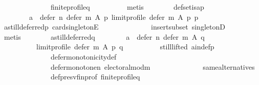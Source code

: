 \begin{isabellebody}
\ \ \ \ \ \ \ \ \ \ \ \ \ \ finite{\isacharunderscore}{\kern0pt}profile{\isacharunderscore}{\kern0pt}q\isanewline
\ \ \ \ \ \ \ \ \isamarkupfalse%
\ metis\isanewline
\ \ \ \ \ \ \isamarkupfalse%
\ def{\isacharunderscore}{\kern0pt}set{\isacharunderscore}{\kern0pt}is{\isacharunderscore}{\kern0pt}a{\isacharunderscore}{\kern0pt}p{\isacharcolon}{\kern0pt}\isanewline
\ \ \ \ \ \ \ \ {\isachardoublequoteopen}{\isacharbraceleft}{\kern0pt}a{\isacharbraceright}{\kern0pt}\ {\isacharequal}{\kern0pt}\ defer\ n\ {\isacharparenleft}{\kern0pt}defer\ m\ A\ p{\isacharparenright}{\kern0pt}\ {\isacharparenleft}{\kern0pt}limit{\isacharunderscore}{\kern0pt}profile\ {\isacharparenleft}{\kern0pt}defer\ m\ A\ p{\isacharparenright}{\kern0pt}\ p{\isacharparenright}{\kern0pt}{\isachardoublequoteclose}\isanewline
\ \ \ \ \ \ \ \ \isamarkupfalse%
\ a{\isacharunderscore}{\kern0pt}still{\isacharunderscore}{\kern0pt}deferred{\isacharunderscore}{\kern0pt}p\ card{\isacharunderscore}{\kern0pt}{}{\isacharunderscore}{\kern0pt}singletonE\isanewline
\ \ \ \ \ \ \ \ \ \ \ \ \ \ insert{\isacharunderscore}{\kern0pt}subset\ singletonD\isanewline
\ \ \ \ \ \ \ \ \isamarkupfalse%
\ metis\isanewline
\ \ \ \ \ \ \isamarkupfalse%
\ a{\isacharunderscore}{\kern0pt}still{\isacharunderscore}{\kern0pt}deferred{\isacharunderscore}{\kern0pt}q{\isacharcolon}{\kern0pt}\isanewline
\ \ \ \ \ \ \ \ {\isachardoublequoteopen}a\ {\isasymin}\ defer\ n\ {\isacharparenleft}{\kern0pt}defer\ m\ A\ q{\isacharparenright}{\kern0pt}\isanewline
\ \ \ \ \ \ \ \ \ \ {\isacharparenleft}{\kern0pt}limit{\isacharunderscore}{\kern0pt}profile\ {\isacharparenleft}{\kern0pt}defer\ m\ A\ p{\isacharparenright}{\kern0pt}\ q{\isacharparenright}{\kern0pt}{\isachardoublequoteclose}\isanewline
\ \ \ \ \ \ \ \ \isamarkupfalse%
\ still{\isacharunderscore}{\kern0pt}lifted\ a{\isacharunderscore}{\kern0pt}in{\isacharunderscore}{\kern0pt}def{\isacharunderscore}{\kern0pt}p\isanewline
\ \ \ \ \ \ \ \ \ \ \ \ \ \ defer{\isacharunderscore}{\kern0pt}monotonicity{\isacharunderscore}{\kern0pt}def\isanewline
\ \ \ \ \ \ \ \ \ \ \ \ \ \ defer{\isacharunderscore}{\kern0pt}monotone{\isacharunderscore}{\kern0pt}n\ electoral{\isacharunderscore}{\kern0pt}mod{\isacharunderscore}{\kern0pt}m\isanewline
\ \ \ \ \ \ \ \ \ \ \ \ \ \ same{\isacharunderscore}{\kern0pt}alternatives\isanewline
\ \ \ \ \ \ \ \ \ \ \ \ \ \ def{\isacharunderscore}{\kern0pt}presv{\isacharunderscore}{\kern0pt}fin{\isacharunderscore}{\kern0pt}prof\ finite{\isacharunderscore}{\kern0pt}profile{\isacharunderscore}{\kern0pt}q\isanewline

\end{isabellebody}
